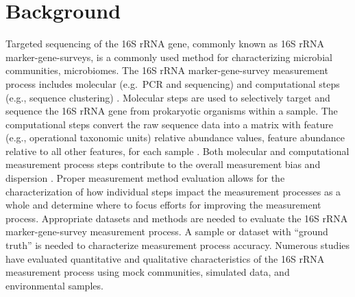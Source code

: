 \documentclass{bmcart}
\begin{document}
\begin{frontmatter}
\begin{abstractbox}

\end{abstractbox}
%

\end{frontmatter}


\section*{Background}

Targeted sequencing of the 16S rRNA gene, commonly known as 16S rRNA
marker-gene-surveys, is a commonly used method for characterizing
microbial communities, microbiomes. The 16S rRNA marker-gene-survey
measurement process includes molecular (e.g.~PCR and sequencing) and
computational steps (e.g., sequence clustering) \cite{Goodrich2014}.
Molecular steps are used to selectively target and sequence the 16S rRNA
gene from prokaryotic organisms within a sample. The computational steps
convert the raw sequence data into a matrix with feature (e.g.,
operational taxonomic units) relative abundance values, feature
abundance relative to all other features, for each sample
\cite{Goodrich2014}. Both molecular and computational measurement
process steps contribute to the overall measurement bias and dispersion
\cite{Amore2016,Goodrich2014,brooks2015truth}. Proper measurement
method evaluation allows for the characterization of how individual
steps impact the measurement processes as a whole and determine where to
focus efforts for improving the measurement process. Appropriate
datasets and methods are needed to evaluate the 16S rRNA
marker-gene-survey measurement process. A sample or dataset with
``ground truth'' is needed to characterize measurement process accuracy.
Numerous studies have evaluated quantitative and qualitative
characteristics of the 16S rRNA measurement process using mock
communities, simulated data, and environmental samples.
\end{document}
